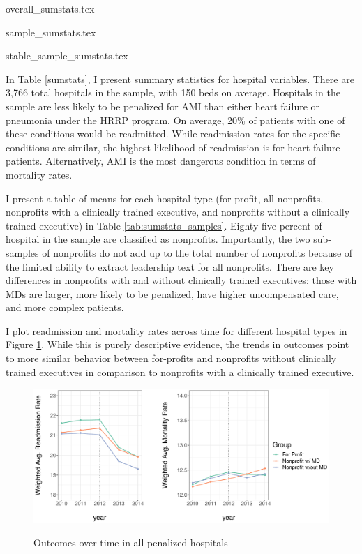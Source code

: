 \documentclass[12pt]{article}
\begin{document}
    {overall_sumstats.tex}

    {sample_sumstats.tex}

    {stable_sample_sumstats.tex}

    In Table \ref{sumstats}, I present summary statistics for hospital variables. There are 3,766 total hospitals in the sample, with 150 beds on average. Hospitals in the sample are less likely to be penalized for AMI than either heart failure or pneumonia under the HRRP program. On average, 20\% of patients with one of these conditions would be readmitted. While readmission rates for the specific conditions are similar, the highest likelihood of readmission is for heart failure patients. Alternatively, AMI is the most dangerous condition in terms of mortality rates. 


    I present a table of means for each hospital type (for-profit, all nonprofits, nonprofits with a clinically trained executive, and nonprofits without a clinically trained executive) in Table \ref{tab:sumstats_samples}. Eighty-five percent of hospital in the sample are classified as nonprofits. Importantly, the two sub-samples of nonprofits do not add up to the total number of nonprofits because of the limited ability to extract leadership text for all nonprofits. There are key differences in nonprofits with and without clinically trained executives: those with MDs are larger, more likely to be penalized, have higher uncompensated care, and more complex patients.  


    I plot readmission and mortality rates across time for different hospital types in Figure \ref{fig:weighted_read_mort_graph}. While this is purely descriptive evidence, the trends in outcomes point to more similar behavior between for-profits and nonprofits without clinically trained executives in comparison to nonprofits with a clinically trained executive.

    \begin{figure}[ht!]
    \centering
        \caption{Outcomes over time in all penalized hospitals}
        \includegraphics[width=\textwidth]{Objects/weighted_read_mort_graph.pdf}
        \label{fig:weighted_read_mort_graph}
    \end{figure}
\end{document}
